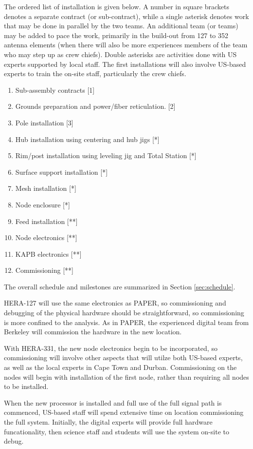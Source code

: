 \documentclass[preprint]{aastex}
\begin{document}
The ordered list of installation is given below. A number in square brackets denotes
a separate contract (or sub-contract), while a single asterisk denotes work that may
be done in parallel by the two teams. An additional team (or teams) may be added to
pace the work, primarily in the build-out from 127 to 352 antenna elements (when there will also be more
experiences members of the team who may step up as crew chiefs). Double asterisks are
activities done with US experts supported by local staff. The first installations
will also involve US-based experts to train the on-site staff, particularly the crew
chiefs.
\begin{enumerate}[itemsep=-3pt]
\item Sub-assembly contracts [1]
\item Grounds preparation and power/fiber reticulation. [2]
\item Pole installation [3]
\item Hub installation using centering and hub jigs  [*]
\item Rim/post installation using leveling jig and Total Station [*]
\item Surface support installation [*]
\item Mesh installation [*]
\item Node enclosure [*]
\item Feed installation [**]
\item Node electronics [**]
\item KAPB electronics [**]
\item Commissioning [**]
\end{enumerate}
The overall schedule and milestones are summarized in Section \ref{sec:schedule}.

HERA-127 will use the same electronics as PAPER, so commissioning and debugging of the physical
hardware should be straightforward, so commissioning is more confined to the analysis.  As in PAPER,
the experienced digital team from Berkeley will commission the hardware in the new location.

With HERA-331, the new node electronics begin to be incorporated, so commissioning will involve
other aspects that will utilze both US-based experts, as well as the local experts in Cape Town and Durban.
Commissioning on the nodes will begin with installation of the first node, rather than requiring all nodes
to be installed.

When the new processor is installed and full use of the full signal path is commenced, US-based staff
will spend extensive time on location commissioning the full system.  Initially, the digital experts will
provide full hardware funcationality, then science staff and students will use the system on-site to debug.
\end{document}
